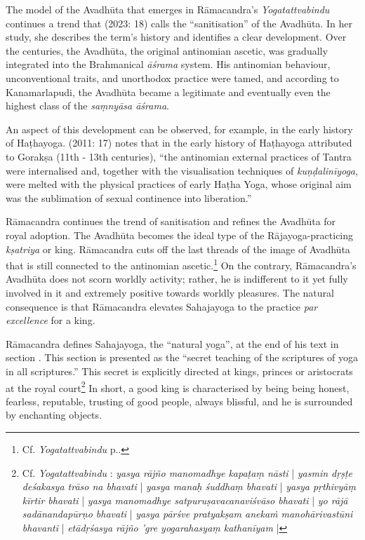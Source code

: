 The model of the Avadhūta that emerges in Rāmacandra's \emph{Yogatattvabindu} continues a trend that \citeauthor{pudi2023} (2023: 18) calls the ``sanitisation'' of the Avadhūta. In her study, she describes the term's history and identifies a clear development. Over the centuries, the Avadhūta, the original antinomian ascetic, was gradually integrated into the Brahmanical \emph{āśrama} system. His antinomian behaviour, unconventional traits, and unorthodox practice were tamed, and according to Kanamarlapudi, the Avadhūta became a legitimate and eventually even the highest class of the \textit{saṃnyāsa āśrama}.

An aspect of this development can be observed, for example, in the early history of Haṭhayoga. \citeauthor{mallinsonnath} (2011: 17) notes that in the early history of Haṭhayoga attributed to Gorakṣa (11th - 13th centuries), ``the antinomian external practices of Tantra were internalised and, together with the visualisation techniques of \textit{kuṇḍalinīyoga}, were melted with the physical practices of early Haṭha Yoga, whose original aim was the sublimation of sexual continence into liberation.''

Rāmacandra continues the trend of sanitisation and refines the Avadhūta for royal adoption. The Avadhūta becomes the ideal type of the Rājayoga-practicing \emph{kṣatriya} or king. Rāmacandra cuts off the last threads of the image of Avadhūta that is still connected to the antinomian ascetic.\footnote{Cf. \emph{Yogatattvabindu}  p.\pageref{avadhuta}.} On the contrary, Rāmacandra's Avadhūta does not scorn worldly activity; rather, he is indifferent to it yet fully involved in it and extremely positive towards worldly pleasures. The natural consequence is that Rāmacandra elevates Sahajayoga to the practice \textit{par excellence} for a king.  

Rāmacandra defines Sahajayoga, the ``natural yoga'', at the end of his text in section . This section is presented as the ``secret teaching of the scriptures of yoga in all scriptures.'' This secret is explicitly directed at kings, princes or aristocrats at the royal court\footnote{Cf. \emph{Yogatattvabindu} : \textit{yasya rājño manomadhye kapaṭaṃ nāsti} | \textit{yasmin dṛṣṭe deśakasya trāso na bhavati} | \textit{yasya manaḥ śuddhaṃ bhavati} | \textit{yasya pṛthivyāṃ kīrtir bhavati} | \textit{yasya manomadhye satpuruṣavacanaviśvāso bhavati} | \textit{yo rājā sadānandapūrṇo bhavati} | \textit{yasya pārśve pratyakṣam anekaṁ manohārivastūni bhavanti} | \textit{etādṛśasya rājño 'gre yogarahasyaṃ kathanīyam} |} In short, a good king is characterised by being being honest, fearless, reputable, trusting of good people, always blissful, and he is surrounded by enchanting objects.

